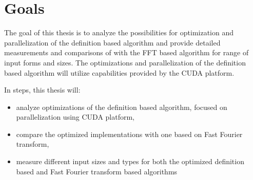 \section*{Goals}
The goal of this thesis is to analyze the possibilities for optimization and parallelization of the definition based algorithm and provide detailed measurements and comparisons of with the FFT based algorithm for range of input forms and sizes. The optimizations and parallelization of the definition based algorithm will utilize capabilities provided by the CUDA platform.

In steps, this thesis will:
\begin{itemize}
	\item analyze optimizations of the definition based algorithm, focused on parallelization using CUDA platform,
	\item compare the optimized implementations with one based on Fast Fourier transform,
	\item measure different input sizes and types for both the optimized definition based and Fast Fourier transform based algorithms
\end{itemize}


